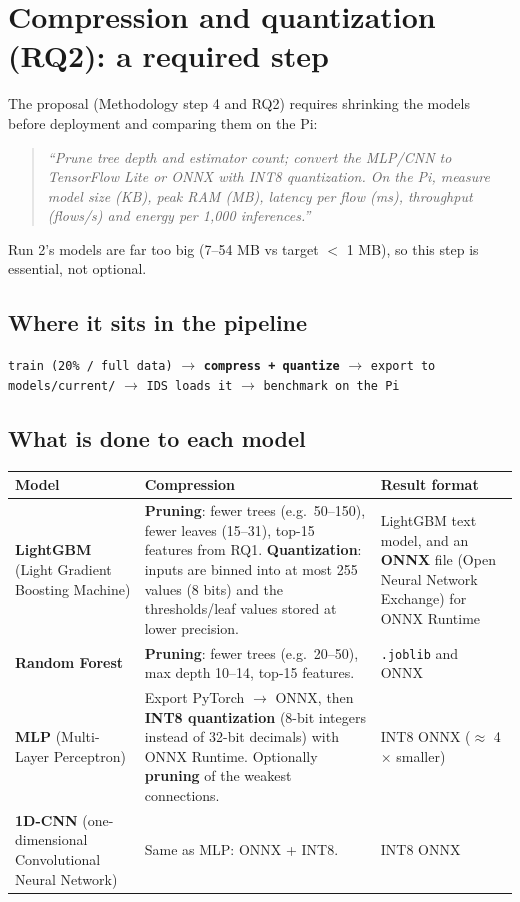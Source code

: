 \documentclass[11pt]{article}
\begin{document}
\newpage
\section{Compression and quantization (RQ2): a required step}
The proposal (Methodology step 4 and RQ2) requires shrinking the models before deployment and comparing them on the Pi:
\begin{quote}\itshape
``Prune tree depth and estimator count; convert the MLP/CNN to TensorFlow Lite or ONNX with INT8 quantization. On the Pi, measure model size (KB),
peak RAM (MB), latency per flow (ms), throughput (flows/s) and energy per 1,000 inferences.''
\end{quote}
Run 2's models are far too big (7--54 MB vs target $<$ 1 MB), so this step is essential, not optional.

\subsection*{Where it sits in the pipeline}
\begin{center}
\texttt{train (20\% / full data)} $\rightarrow$ \textbf{\texttt{compress + quantize}} $\rightarrow$ \texttt{export to models/current/} $\rightarrow$
\texttt{IDS loads it} $\rightarrow$ \texttt{benchmark on the Pi}
\end{center}

\subsection*{What is done to each model}
\begin{longtable}{@{}>{\raggedright}p{3.2cm} >{\raggedright}p{6.8cm} >{\raggedright\arraybackslash}p{6cm}@{}}
\toprule
\textbf{Model} & \textbf{Compression} & \textbf{Result format} \\
\midrule
\endhead
\textbf{LightGBM} (Light Gradient Boosting Machine) & \textbf{Pruning}: fewer trees (e.g.\ 50--150), fewer leaves (15--31), top-15 features from RQ1.
\textbf{Quantization}: inputs are binned into at most 255 values (8 bits) and the thresholds/leaf values stored at lower precision. &
LightGBM text model, and an \textbf{ONNX} file (Open Neural Network Exchange) for ONNX Runtime \\
\textbf{Random Forest} & \textbf{Pruning}: fewer trees (e.g.\ 20--50), max depth 10--14, top-15 features. & \texttt{.joblib} and ONNX \\
\textbf{MLP} (Multi-Layer Perceptron) & Export PyTorch $\rightarrow$ ONNX, then \textbf{INT8 quantization} (8-bit integers instead of 32-bit decimals) with ONNX Runtime.
Optionally \textbf{pruning} of the weakest connections. & INT8 ONNX ($\approx$ 4$\times$ smaller) \\
\textbf{1D-CNN} (one-dimensional Convolutional Neural Network) & Same as MLP: ONNX + INT8. & INT8 ONNX \\
\bottomrule
\end{longtable}
\end{document}
